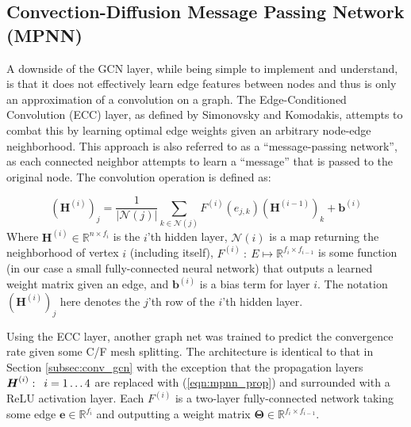 \documentclass[review]{siamart190516}
\newcommand{\abs}[1]{\left\lvert#1\right\rvert}
\newcommand{\mat}[1]{\bm{{#1}}}
\renewcommand{\vec}[1]{\bm{{#1}}}
\newcommand{\hquad}{\enskip}
\begin{document}
\subsection{Convection-Diffusion Message Passing Network (MPNN)}\label{subsec:conv_mpnn}
A downside of the GCN layer, while being simple to implement and understand, is that it does not effectively learn edge features between nodes and thus is only an approximation of a convolution on a graph.  The Edge-Conditioned Convolution (ECC) layer, as defined by Simonovsky and Komodakis\cite{ecc}, attempts to combat this by learning optimal edge weights given an arbitrary node-edge neighborhood.  This approach is also referred to as a ``message-passing network'', as each connected neighbor attempts to learn a ``message'' that is passed to the original node.  The convolution operation is defined as:

\begin{equation}\label{eqn:mpnn_prop}
  \left(\mat{H}^{(i)}\right)_j = \frac{1}{\abs{\mathcal{N}\left(j\right)}} \sum_{k\in\mathcal{N}\left(j\right)} F^{(i)}\left(e_{j,k}\right)\left(\mat{H}^{(i-1)}\right)_k + \vec{b}^{(i)}
\end{equation}
Where $\mat{H}^{\left(i\right)} \in \mathbb{R}^{n \times f_i}$ is the $i$'th hidden layer, $\mathcal{N}\left(i\right)$ is a map returning the neighborhood of vertex $i$ (including itself), $F^{(i)} \: : \: E \mapsto \mathbb{R}^{f_i \times f_{i-1}}$ is some function (in our case a small fully-connected neural network) that outputs a learned weight matrix given an edge, and $\vec{b}^{(i)}$ is a bias term for layer $i$.  The notation $\left(\mat{H}^{\left(i\right)}\right)_j$ here denotes the $j$'th row of the $i$'th hidden layer.

Using the ECC layer, another graph net was trained to predict the convergence rate given some C/F mesh splitting.  The architecture is identical to that in Section \ref{subsec:conv_gcn} with the exception that the propagation layers $\mat{H}^{(i)}: \hquad i=1\ldots 4$ are replaced with (\ref{eqn:mpnn_prop}) and surrounded with a ReLU activation layer.  Each $F^{(i)}$ is a two-layer fully-connected network taking some edge $\vec{e} \in \mathbb{R}^{f_i}$ and outputting a weight matrix $\mat{\Theta} \in \mathbb{R}^{f_i\times f_{i-1}}$.

\end{document}
